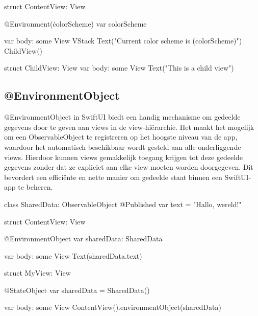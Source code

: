 \begin{swift}[caption=Example of Observable, label=Observable_example]
struct ContentView: View {
    @Environment(\.colorScheme) var colorScheme
    
    var body: some View {
        VStack {
            Text("Current color scheme is (colorScheme)")
            ChildView()
        }
    }
}

struct ChildView: View {
    var body: some View {
        Text("This is a child view")
    }
}
\end{swift}

\subsection{@EnvironmentObject}
\autocite{AppleEnvironmentObject} @EnvironmentObject in SwiftUI biedt een handig mechanisme om gedeelde gegevens door te geven aan views in de view-hiërarchie. Het maakt het mogelijk om een ObservableObject te registreren op het hoogste niveau van de app, waardoor het automatisch beschikbaar wordt gesteld aan alle onderliggende views. Hierdoor kunnen views gemakkelijk toegang krijgen tot deze gedeelde gegevens zonder dat ze expliciet aan elke view moeten worden doorgegeven. Dit bevordert een efficiënte en nette manier om gedeelde staat binnen een SwiftUI-app te beheren.


\begin{swift}[caption=Example of EnvironmentObject, label=EnvironmentObject_example]
    class SharedData: ObservableObject {
        @Published var text = "Hallo, wereld!"
    }
    
    struct ContentView: View {
        @EnvironmentObject var sharedData: SharedData
        
        var body: some View {
            Text(sharedData.text)
        }
    }

    struct MyView: View {
        @StateObject var sharedData = SharedData()
        
        var body: some View {
            ContentView().environmentObject(sharedData)
        }
    }
\end{swift}

